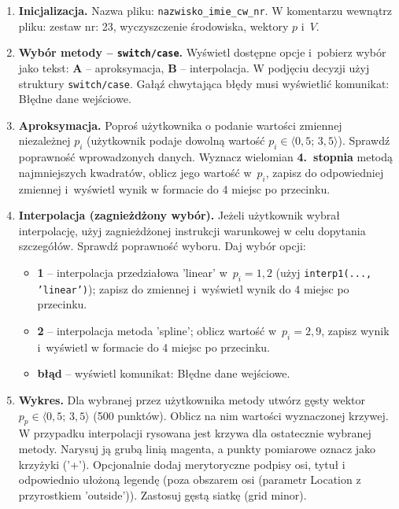\documentclass[a4paper,11pt]{article}
\begin{document}
\begin{enumerate}[leftmargin=*, label=\textbf{\arabic*.}, itemsep=2pt]

  \item \textbf{Inicjalizacja.}
    Nazwa pliku: \texttt{nazwisko\_imie\_cw\_nr}. W komentarzu wewnątrz pliku: zestaw nr: 23, wyczyszczenie środowiska, wektory $p$ i~$V$.

  \item \textbf{Wybór metody -- \texttt{switch/case}.}
    Wyświetl dostępne opcje i~pobierz wybór jako tekst: \textbf{A} -- aproksymacja, \textbf{B} -- interpolacja. W podjęciu decyzji użyj struktury \texttt{switch/case}. Gałąź chwytająca błędy musi wyświetlić komunikat: Błędne dane wejściowe.

  \item \textbf{Aproksymacja.}
    Poproś użytkownika o podanie wartości zmiennej niezależnej $p_i$ (użytkownik podaje dowolną wartość $p_i \in \langle 0{,}5;\,3{,}5 \rangle$). Sprawdź poprawność wprowadzonych danych. Wyznacz wielomian \textbf{4.~stopnia} metodą najmniejszych kwadratów, oblicz jego wartość w~$p_i$, zapisz do odpowiedniej zmiennej i~wyświetl wynik w formacie do 4 miejsc po przecinku.

  \item \textbf{Interpolacja (zagnieżdżony wybór).}
    Jeżeli użytkownik wybrał interpolację, użyj zagnieżdżonej instrukcji warunkowej w celu dopytania szczegółów. Sprawdź poprawność wyboru. Daj wybór opcji:
    \begin{itemize}[itemsep=1pt]
      \item \textbf{1} -- interpolacja przedziałowa 'linear' w~$p_i = 1{,}2$ (użyj \texttt{interp1(..., 'linear')}); zapisz do zmiennej i~wyświetl wynik do 4 miejsc po przecinku.
      \item \textbf{2} -- interpolacja metoda 'spline'; oblicz wartość w~$p_i = 2{,}9$, zapisz wynik i~wyświetl w formacie do 4 miejsc po przecinku.
      \item \textbf{błąd} -- wyświetl komunikat: Błędne dane wejściowe.
    \end{itemize}

  \item \textbf{Wykres.}
    Dla wybranej przez użytkownika metody utwórz gęsty wektor $p_p \in \langle 0{,}5;\,3{,}5 \rangle$ (500 punktów). Oblicz na nim wartości wyznaczonej krzywej. W przypadku interpolacji rysowana jest krzywa dla ostatecznie wybranej metody. Narysuj ją grubą linią magenta, a punkty pomiarowe oznacz jako krzyżyki ('+'). Opcjonalnie dodaj merytoryczne podpisy osi, tytuł i odpowiednio ułożoną legendę (poza obszarem osi (parametr Location z przyrostkiem 'outside')). Zastosuj gęstą siatkę (grid minor).

\end{enumerate}
\end{document}
